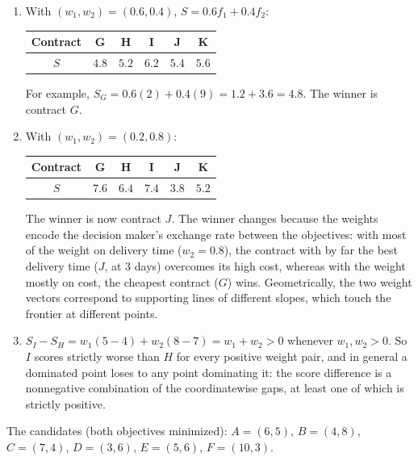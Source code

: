 \begin{enumerate}
\item With $(w_1, w_2) = (0.6, 0.4)$, $S = 0.6 f_1 + 0.4 f_2$:
\begin{center}
\begin{tabular}{c|ccccc}
Contract & G & H & I & J & K \\\hline
$S$ & $\mathbf{4.8}$ & $5.2$ & $6.2$ & $5.4$ & $5.6$ \\
\end{tabular}
\end{center}
For example, $S_G = 0.6(2) + 0.4(9) = 1.2 + 3.6 = 4.8$. The winner is
contract $G$.
\item With $(w_1, w_2) = (0.2, 0.8)$:
\begin{center}
\begin{tabular}{c|ccccc}
Contract & G & H & I & J & K \\\hline
$S$ & $7.6$ & $6.4$ & $7.4$ & $\mathbf{3.8}$ & $5.2$ \\
\end{tabular}
\end{center}
The winner is now contract $J$. The winner changes because the weights encode
the decision maker's exchange rate between the objectives: with most of the
weight on delivery time ($w_2 = 0.8$), the contract with by far the best
delivery time ($J$, at 3 days) overcomes its high cost, whereas with the
weight mostly on cost, the cheapest contract ($G$) wins. Geometrically, the
two weight vectors correspond to supporting lines of different slopes, which
touch the frontier at different points.
\item $S_I - S_H = w_1(5 - 4) + w_2(8 - 7) = w_1 + w_2 > 0$ whenever
$w_1, w_2 > 0$. So $I$ scores strictly worse than $H$ for every positive
weight pair, and in general a dominated point loses to any point dominating
it: the score difference is a nonnegative combination of the coordinatewise
gaps, at least one of which is strictly positive.
\end{enumerate}


The candidates (both objectives minimized):
$A = (6,5)$, $B = (4,8)$, $C = (7,4)$, $D = (3,6)$, $E = (5,6)$,
$F = (10,3)$.

